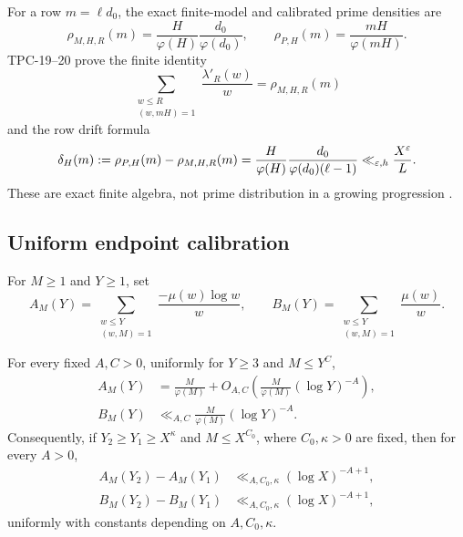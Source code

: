 For a row \(m=\ell d_0\), the exact finite-model and calibrated prime
densities are
\begin{equation}
 \rho_{M,H,R}(m)=
 \frac{H}{\varphi(H)}\frac {d_0}{\varphi(d_0)},
 \qquad
 \rho_{P,H}(m)=\frac{mH}{\varphi(mH)}.
 \label{eq:two-densities}
\end{equation}
TPC-19--20 prove the finite identity
\begin{equation}
 \sum_{\substack{w\le R\\(w,mH)=1}}
 \frac{\lambda'_R(w)}w
 =\rho_{M,H,R}(m)
 \label{eq:model-density-identity}
\end{equation}
and the row drift formula
\begin{equation}
 \delta_H(m):=\rho_{P,H}(m)-\rho_{M,H,R}(m)
 =
 \frac{H}{\varphi(H)}
 \frac{d_0}{\varphi(d_0)(\ell-1)}
 \ll_{\varepsilon,h}\frac{X^\varepsilon}{L}.
 \label{eq:row-drift}
\end{equation}
These are exact finite algebra, not prime distribution in a growing
progression \citep{WangTPC19,WangTPC20}.

\subsection{Uniform endpoint calibration}

For \(M\ge1\) and \(Y\ge1\), set
\begin{equation}
 A_M(Y)=
 \sum_{\substack{w\le Y\\(w,M)=1}}
 \frac{-\mu(w)\log w}{w},
 \qquad
 B_M(Y)=
 \sum_{\substack{w\le Y\\(w,M)=1}}\frac{\mu(w)}w.
 \label{eq:ABM}
\end{equation}

\begin{lemma}
\label{lem:uniform-companion}
For every fixed \(A,C>0\), uniformly for \(Y\ge3\) and
\(M\le Y^C\),
\begin{align}
 A_M(Y)
 &=
 \frac M{\varphi(M)}
 +O_{A,C}\left(
 \frac M{\varphi(M)}(\log Y)^{-A}\right),
 \label{eq:A-calibration}\\
 B_M(Y)
 &\ll_{A,C}
 \frac M{\varphi(M)}(\log Y)^{-A}.
 \label{eq:B-calibration}
\end{align}
Consequently, if \(Y_2\ge Y_1\ge X^\kappa\) and
\(M\le X^{C_0}\), where \(C_0,\kappa>0\) are fixed, then for every
\(A>0\),
\begin{align}
 A_M(Y_2)-A_M(Y_1)
 &\ll_{A,C_0,\kappa}(\log X)^{-A+1},
 \label{eq:A-interval}\\
 B_M(Y_2)-B_M(Y_1)
 &\ll_{A,C_0,\kappa}(\log X)^{-A+1},
 \label{eq:B-interval}
\end{align}
uniformly with constants depending on \(A,C_0,\kappa\).
\end{lemma}

